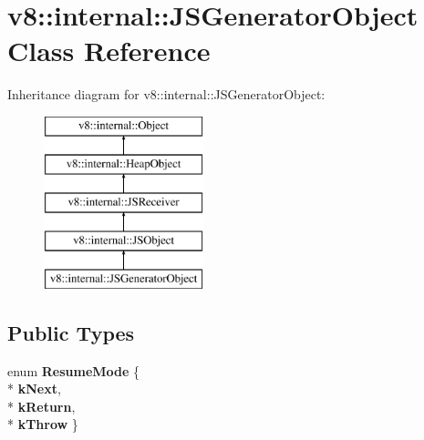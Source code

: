 \hypertarget{classv8_1_1internal_1_1_j_s_generator_object}{}\section{v8\+:\+:internal\+:\+:J\+S\+Generator\+Object Class Reference}
\label{classv8_1_1internal_1_1_j_s_generator_object}
Inheritance diagram for v8\+:\+:internal\+:\+:J\+S\+Generator\+Object\+:\begin{figure}[H]
\begin{center}
\leavevmode
\includegraphics[height=5.000000cm]{classv8_1_1internal_1_1_j_s_generator_object}
\end{center}
\end{figure}
\subsection*{Public Types}
\begin{DoxyCompactItemize}
\item 
enum {\bfseries Resume\+Mode} \{ \\*
{\bfseries k\+Next}, 
\\*
{\bfseries k\+Return}, 
\\*
{\bfseries k\+Throw}
 \}\hypertarget{classv8_1_1internal_1_1_j_s_generator_object_a8a7b5950a31ccfb7e1919c4758863d75}{}\label{classv8_1_1internal_1_1_j_s_generator_object_a8a7b5950a31ccfb7e1919c4758863d75}

\end{DoxyCompactItemize}
